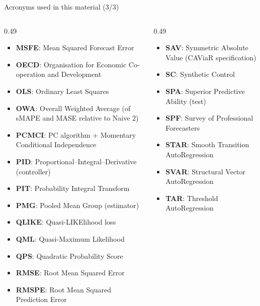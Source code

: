 \begin{frame}{Acronyms used in this material (3/3)}
\begin{columns}[T]
\begin{column}{0.49\textwidth}
\begin{itemize}\setlength{\itemsep}{0pt}
    \item \textbf{MSFE}: Mean Squared Forecast Error
    \item \textbf{OECD}: Organisation for Economic Co-operation and Development
    \item \textbf{OLS}: Ordinary Least Squares
    \item \textbf{OWA}: Overall Weighted Average (of sMAPE and MASE relative to Naive 2)
    \item \textbf{PCMCI}: PC algorithm + Momentary Conditional Independence
    \item \textbf{PID}: Proportional--Integral--Derivative (controller)
    \item \textbf{PIT}: Probability Integral Transform
    \item \textbf{PMG}: Pooled Mean Group (estimator)
    \item \textbf{QLIKE}: Quasi-LIKElihood loss
    \item \textbf{QML}: Quasi-Maximum Likelihood
    \item \textbf{QPS}: Quadratic Probability Score
    \item \textbf{RMSE}: Root Mean Squared Error
    \item \textbf{RMSPE}: Root Mean Squared Prediction Error
\end{itemize}
\end{column}
\begin{column}{0.49\textwidth}
\begin{itemize}\setlength{\itemsep}{0pt}
    \item \textbf{SAV}: Symmetric Absolute Value (CAViaR specification)
    \item \textbf{SC}: Synthetic Control
    \item \textbf{SPA}: Superior Predictive Ability (test)
    \item \textbf{SPF}: Survey of Professional Forecasters
    \item \textbf{STAR}: Smooth Transition AutoRegression
    \item \textbf{SVAR}: Structural Vector AutoRegression
    \item \textbf{TAR}: Threshold AutoRegression

\end{itemize}
\end{column}
\end{columns}
\end{frame}
